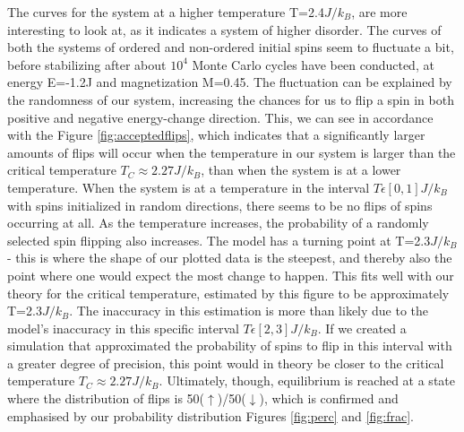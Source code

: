 \documentclass[10pt, nofootinbib, twocolumn]{revtex4-1}
\begin{document}
The curves for the system at a higher temperature T=2.4$J/k_B$, are more interesting to look at, as it indicates a system of higher disorder. The curves of both the systems of ordered and non-ordered initial spins seem to fluctuate a bit, before stabilizing after about $10^4$ Monte Carlo cycles have been conducted, at energy E=-1.2J and magnetization M=0.45. The fluctuation can be explained by the randomness of our system, increasing the chances for us to flip a spin in both positive and negative energy-change direction. This, we can see in accordance with the Figure \ref{fig:acceptedflips}, which indicates that a significantly larger amounts of flips will occur when the temperature in our system is larger than the critical temperature $T_C\approx 2.27 J/k_B$, than when the system is at a lower temperature. When the system is at a temperature in the interval $T\epsilon [0,1]J/k_B$ with spins initialized in random directions, there seems to be no flips of spins occurring at all. As the temperature increases, the probability of a randomly selected spin flipping also increases. The model has a turning point at T=2.3$J/k_B$ - this is where the shape of our plotted data is the steepest, and thereby also the point where one would expect the most change to happen. This fits well with our theory for the critical temperature, estimated by this figure to be approximately T=2.3$J/k_B$. The inaccuracy in this estimation is more than likely due to the model's inaccuracy in this specific interval $T\epsilon [2,3]J/k_B$. If we created a simulation that approximated the probability of spins to flip in this interval with a greater degree of precision, this point would in theory be closer to the critical temperature $T_C\approx 2.27 J/k_B$.
Ultimately, though, equilibrium is reached at a state where the distribution of flips is 50($\uparrow$)/50($\downarrow$), which is confirmed and emphasised by our probability distribution Figures \ref{fig:perc} and \ref{fig:frac}. \\
\end{document}
